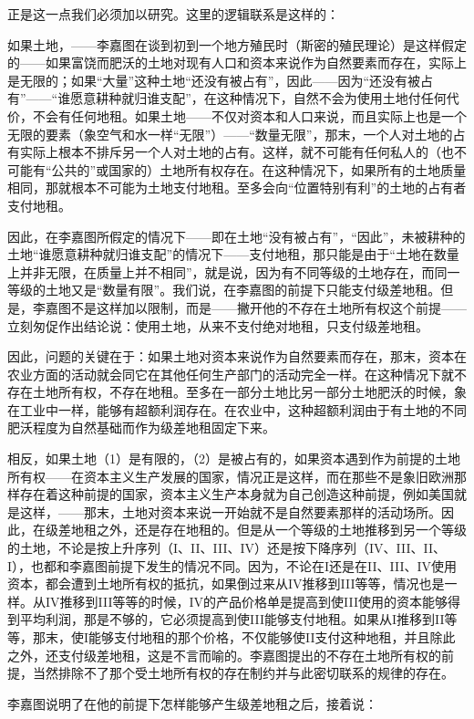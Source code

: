 正是这一点我们必须加以研究。这里的逻辑联系是这样的：

如果土地，——李嘉图在谈到初到一个地方殖民时（斯密的殖民理论）是这样假定的——如果富饶而肥沃的土地对现有人口和资本来说作为自然要素而存在，实际上是无限的；如果“大量”这种土地“还没有被占有”，因此——因为“还没有被占有”——“谁愿意耕种就归谁支配”，在这种情况下，自然不会为使用土地付任何代价，不会有任何地租。如果土地——不仅对资本和人口来说，而且实际上也是一个无限的要素（象空气和水一样“无限”）——“数量无限”，那末，一个人对土地的占有实际上根本不排斥另一个人对土地的占有。这样，就不可能有任何私人的（也不可能有“公共的”或国家的）土地所有权存在。在这种情况下，如果所有的土地质量相同，那就根本不可能为土地支付地租。至多会向“位置特别有利”的土地的占有者支付地租。

因此，在李嘉图所假定的情况下——即在土地“没有被占有”，“因此”，未被耕种的土地“谁愿意耕种就归谁支配”的情况下——支付地租，那只能是由于“土地在数量上并非无限，在质量上并不相同”，就是说，因为有不同等级的土地存在，而同一等级的土地又是“数量有限”。我们说，在李嘉图的前提下只能支付级差地租。但是，李嘉图不是这样加以限制，而是——撇开他的不存在土地所有权这个前提——立刻匆促作出结论说：使用土地，从来不支付绝对地租，只支付级差地租。

因此，问题的关键在于：如果土地对资本来说作为自然要素而存在，那末，资本在农业方面的活动就会同它在其他任何生产部门的活动完全一样。在这种情况下就不存在土地所有权，不存在地租。至多在一部分土地比另一部分土地肥沃的时候，象在工业中一样，能够有超额利润存在。在农业中，这种超额利润由于有土地的不同肥沃程度为自然基础而作为级差地租固定下来。

相反，如果土地（1）是有限的，（2）是被占有的，如果资本遇到作为前提的土地所有权——在资本主义生产发展的国家，情况正是这样，而在那些不是象旧欧洲那样存在着这种前提的国家，资本主义生产本身就为自己创造这种前提，例如美国就是这样，——那末，土地对资本来说一开始就不是自然要素那样的活动场所。因此，在级差地租之外，还是存在地租的。但是从一个等级的土地推移到另一个等级的土地，不论是按上升序列（I、II、III、IV）还是按下降序列（IV、III、II、I），也都和李嘉图前提下发生的情况不同。因为，不论在I还是在II、III、IV使用资本，都会遭到土地所有权的抵抗，如果倒过来从IV推移到III等等，情况也是一样。从IV推移到III等等的时候，IV的产品价格单是提高到使III使用的资本能够得到平均利润，那是不够的，它必须提高到使III能够支付地租。如果从I推移到II等等，那末，使I能够支付地租的那个价格，不仅能够使II支付这种地租，并且除此之外，还支付级差地租，这是不言而喻的。李嘉图提出的不存在土地所有权的前提，当然排除不了那个受土地所有权的存在制约并与此密切联系的规律的存在。

李嘉图说明了在他的前提下怎样能够产生级差地租之后，接着说：

